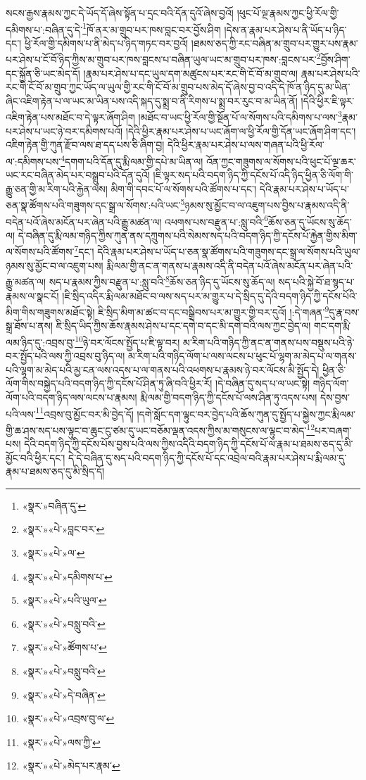 སངས་རྒྱས་རྣམས་ཀྱང་དེ་ཡོད་དོ་ཞེས་སྟོན་པ་དྲང་བའི་དོན་དུའོ་ཞེས་བྱའོ། །ཕུང་པོ་ལྔ་རྣམས་ཀྱང་ཕྱི་རོལ་གྱི་དམིགས་པ་:བཞིན་དུ་དེ་\footnote{«སྣར་»བཞིན་དུ་}ཁོ་ནར་མ་གྲུབ་པར་ཁས་བླང་བར་བྱོས་ཤིག །དེས་ན་རྣམ་པར་ཤེས་པ་ནི་ཡོད་པ་ཉིད་དང་། ཕྱི་རོལ་གྱི་དམིགས་པ་ནི་མེད་པ་ཉིད་གཏང་བར་བྱའོ། །ཐམས་ཅད་ཀྱི་རང་བཞིན་མ་གྲུབ་པར་གྱུར་པས་རྣམ་པར་ཤེས་པ་ངོ་བོ་ཉིད་ཀྱིས་མ་གྲུབ་པར་ཁས་བླངས་པ་བཞིན་ཡུལ་ཡང་མ་གྲུབ་པར་ཁས་:བླངས་པར་\footnote{«སྣར་»«པེ་»བླང་བར་}བྱོས་ཤིག་དང་སྐྱོན་ཅི་ཡང་མེད་དོ། །རྣམ་པར་ཤེས་པ་དང་ཡུལ་དག་མཚུངས་པར་རང་གི་ངོ་བོ་མ་གྲུབ་ལ། རྣམ་པར་ཤེས་པའི་རང་གི་ངོ་བོ་མ་གྲུབ་ཀྱང་ཡོད་ལ་ཡུལ་གྱི་རང་གི་ངོ་བོ་མ་གྲུབ་པས་མེད་དོ་ཞེས་བྱ་བ་འདི་དེ་ཁོ་ན་ཉིད་དུ་མ་ཡིན་ཞིང་འཇིག་རྟེན་པ་ལ་ཡང་མ་ཡིན་པས་འདི་སྐད་དུ་སྨྲ་བ་ནི་རིགས་པ་སྨྲ་བར་རུང་བ་མ་ཡིན་ནོ། །དེའི་ཕྱིར་ཇི་ལྟར་འཇིག་རྟེན་པས་མཐོང་བ་དེ་ལྟར་ཞོག་ཤིག །མཐོང་བ་ཡང་ཕྱི་རོལ་གྱི་སྔོན་པོ་ལ་སོགས་པའི་དམིགས་པ་ལས་\footnote{«སྣར་»«པེ་»ལ་}རྣམ་པར་ཤེས་པ་ཡང་ཉེ་བར་དམིགས་པའོ། །དེའི་ཕྱིར་རྣམ་པར་ཤེས་པ་ཡང་ཞོག་ལ་ཕྱི་རོལ་གྱི་དོན་ཡང་ཞོག་ཤིག་དང་། འཇིག་རྟེན་གྱི་ཀུན་རྫོབ་ལས་ཐ་དད་པས་ཅི་ཞིག་བྱ། དེའི་ཕྱིར་རྣམ་པར་ཤེས་པ་ལས་གཞན་པའི་ཕྱི་རོལ་ལ་:དམིགས་པས་\footnote{«སྣར་»«པེ་»དམིགས་པ་}དགག་པའི་དོན་དུ་རྨི་ལམ་གྱི་དཔེ་མ་ཡིན་ལ། འོན་ཀྱང་གཟུགས་ལ་སོགས་པའི་ཕུང་པོ་ལྔ་ཆར་ཡང་རང་བཞིན་མེད་པར་བསྒྲུབ་པའི་དོན་དུའོ། །ཇི་ལྟར་སད་པའི་བདག་ཉིད་ཀྱི་དངོས་པོ་འདི་ཉིད་ཕྱིན་ཅི་ལོག་གི་རྒྱུ་ཅན་གྱི་མ་རིག་པའི་རྐྱེན་ལས། མིག་གི་དབང་པོ་ལ་སོགས་པའི་ཚོགས་པ་དང་། དེའི་རྣམ་པར་ཤེས་པ་ཡོད་པ་ཅན་སྣ་ཚོགས་པའི་གཟུགས་དང་སྒྲ་ལ་སོགས་:པའི་ཡང་\footnote{«སྣར་»«པེ་»པའི་ཡུལ་}ཉམས་སུ་མྱོང་བ་ལ་འཇུག་པས་བྱིས་པ་རྣམས་འདི་ནི་བདེན་པའོ་ཞེས་མངོན་པར་ཞེན་པའི་རྒྱུ་མཚན་ལ། འཕགས་པས་བརྫུན་པ་:སླུ་བའི་\footnote{«སྣར་»«པེ་»བསླུ་བའི་}ཆོས་ཅན་དུ་ཡོངས་སུ་ཆོད་ལ། དེ་བཞིན་དུ་རྨི་ལམ་གཉིད་ཀྱིས་ཀུན་ནས་དཀྲུགས་པའི་སེམས་སད་པའི་བདག་ཉིད་ཀྱི་དངོས་པོ་རྐྱེན་གྱིས་མིག་ལ་སོགས་པའི་ཚོགས་\footnote{«སྣར་»«པེ་»ཚོགས་པ་}དང་། དེའི་རྣམ་པར་ཤེས་པ་ཡོད་པ་ཅན་སྣ་ཚོགས་པའི་གཟུགས་དང་སྒྲ་ལ་སོགས་པའི་ཡུལ་ཉམས་སུ་མྱོང་བ་ལ་འཇུག་པས། རྨི་ལམ་གྱི་ནང་ན་གནས་པ་རྣམས་འདི་ནི་བདེན་པའོ་ཞེས་མངོན་པར་ཞེན་པའི་རྒྱུ་མཚན་ལ། སད་པ་རྣམས་ཀྱིས་བརྫུན་པ་:སླུ་བའི་\footnote{«སྣར་»«པེ་»བསླུ་བའི་}ཆོས་ཅན་ཉིད་དུ་ཡོངས་སུ་ཆོད་ལ། སད་པའི་སྐྱེ་བོ་ཐ་སྙད་པ་རྣམས་ལ་སྣང་ངོ། །ཇི་སྲིད་འདིར་རྨི་ལམ་མཐོང་བ་ལས་སད་པར་མ་གྱུར་པ་དེ་སྲིད་དུ་དེའི་བདག་ཉིད་ཀྱི་དངོས་པོའི་མིག་གིས་གཟུགས་མཐོང་སྟེ། ཇི་སྲིད་མིག་མ་ཚང་བ་དང་བསྒྲིབས་པར་མ་གྱུར་གྱི་བར་དུའོ། །:དེ་གཞན་\footnote{«སྣར་»«པེ་»དེ་བཞིན་}དུ་རྣ་བས་སྒྲ་ཐོས་པ་ནས། ཇི་སྲིད་ཡིད་ཀྱིས་ཆོས་རྣམས་ཤེས་པ་དང་དགེ་བ་དང་མི་དགེ་བའི་ལས་ཀྱང་བྱེད་ལ། གང་དག་རྨི་ལམ་ཉིད་དུ་:འབྲས་བུ་\footnote{«སྣར་»«པེ་»འབྲས་བུ་ལ་}ཉེ་བར་ལོངས་སྤྱོད་པ་ཇི་ལྟ་བར། མ་རིག་པའི་གཉིད་ཀྱི་ནང་ན་གནས་པས་བསྡུས་པའི་ཉེ་བར་སྤྱོད་པའི་ལས་ཀྱི་འབྲས་བུ་ཉིད་ལ། མ་རིག་པའི་གཉིད་ལོག་པ་ལས་ལངས་པ་ཕུང་པོ་ལྷག་མ་མེད་པ་ལ་གནས་པའི་ལྷག་མ་མེད་པའི་མྱ་ངན་ལས་འདས་པ་ལ་གནས་པའི་འཕགས་པ་རྣམས་ཉེ་བར་ལོངས་མི་སྤྱོད་དེ། ཕྱིན་ཅི་ལོག་གིས་བསྐྱེད་པའི་བདག་ཉིད་ཀྱི་དངོས་པོ་ཤིན་ཏུ་ཞི་བའི་ཕྱིར་རོ། །དེ་བཞིན་དུ་སད་པ་ལ་ཡང་སྟེ། གཉིད་ལོག་ལོག་པའི་བདག་ཉིད་ལས་ལངས་པ་རྣམས། རྨི་ལམ་གྱི་བདག་ཉིད་ཀྱི་དངོས་པོ་ལས་ཤིན་ཏུ་འདས་པས། དེས་བྱས་པའི་ལས་\footnote{«སྣར་»«པེ་»ལས་ཀྱི་}འབྲས་བུ་མྱོང་བར་མི་བྱེད་དོ། །དགེ་སློང་དག་ལྟུང་བར་བྱེད་པའི་ཆོས་ཀུན་དུ་སྤྱོད་པ་སྐྱེས་ཀྱང་རྨི་ལམ་གྱི་ཆ་ཤས་སད་པས་ལྟུང་བ་ཆུང་ངུ་ཙམ་དུ་ཡང་བཅོམ་ལྡན་འདས་ཀྱིས་མ་གསུངས་ལ་ལྟུང་བ་མེད་\footnote{«སྣར་»«པེ་»མེད་པར་རྣམ་}པར་བཞག་པས། དེའི་བདག་ཉིད་ཀྱི་དངོས་པོས་བྱས་པའི་ལས་ཀྱིས་འདིའི་བདག་ཉིད་ཀྱི་དངོས་པོ་ལ་རྣམ་པ་ཐམས་ཅད་དུ་མི་མྱོང་བའི་ཕྱིར་དང་། དེ་དེ་བཞིན་དུ་སད་པའི་བདག་ཉིད་ཀྱི་དངོས་པོ་དང་འབྲེལ་བའི་རྣམ་པར་ཤེས་པ་རྨི་ལམ་དུ་རྣམ་པ་ཐམས་ཅད་དུ་མི་སྲིད་དོ། 
